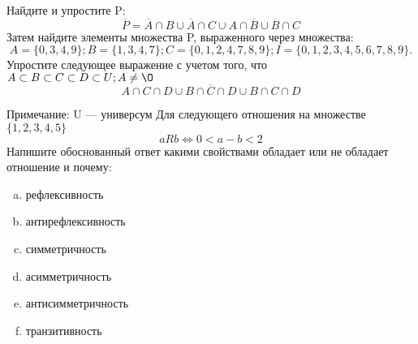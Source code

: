 \documentclass[10pt]{exam}
\begin{document}
\begin{questions}
\question
Найдите и упростите P:
\begin{equation*}
\overline{P} = \overline{A} \cap B \cup \overline{A} \cap C \cup A \cap \overline{B} \cup \overline{B} \cap C
\end{equation*}
Затем найдите элементы множества P, выраженного через множества:
\begin{equation*}
A = \{0, 3, 4, 9\}; 
B = \{1, 3, 4, 7\};
C = \{0, 1, 2, 4, 7, 8, 9\};
I = \{0, 1, 2, 3, 4, 5, 6, 7, 8, 9\}.
\end{equation*}\question
Упростите следующее выражение с учетом того, что $A\subset B \subset C \subset D \subset U; A \neq \O$
\begin{equation*}
A \cap C  \cap D \cup B \cap \overline{C} \cap D \cup B \cap C \cap D
\end{equation*}

Примечание: U — универсум\question
Для следующего отношения на множестве $\{1, 2, 3, 4, 5\}$ 
\begin{equation*}
aRb \iff 0 < a-b<2
\end{equation*}
Напишите обоснованный ответ какими свойствами обладает или не обладает отношение и почему:   
\begin{enumerate} [a)]\setcounter{enumi}{0}
\item рефлексивность
\item антирефлексивность
\item симметричность
\item асимметричность
\item антисимметричность
\item транзитивность
\end{enumerate}


\end{questions}
\end{document}
